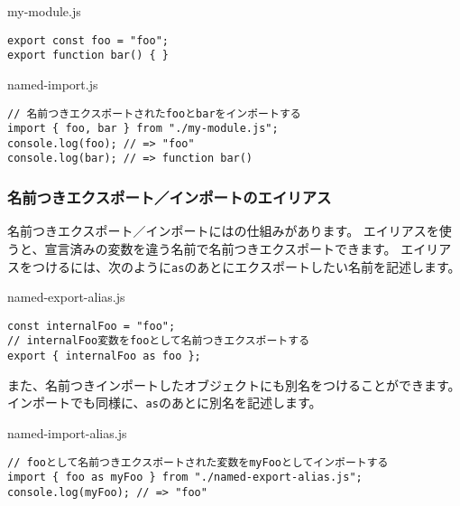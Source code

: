 \begin{listtitle}
my-module.js
\end{listtitle}
\begin{lstlisting}
export const foo = "foo";
export function bar() { }
\end{lstlisting}
\listend

\begin{listtitle}
named-import.js
\end{listtitle}
\enlargethispage{\baselineskip}\begin{lstlisting}
// 名前つきエクスポートされたfooとbarをインポートする
import { foo, bar } from "./my-module.js";
console.log(foo); // => "foo"
console.log(bar); // => function bar()
\end{lstlisting}
\listend

\hypertarget{named-export-import-alias}{%
\subsubsection{名前つきエクスポート／インポートのエイリアス}\label{named-export-import-alias}}

名前つきエクスポート／インポートには\textbf{}の仕組みがあります。
エイリアスを使うと、宣言済みの変数を違う名前で名前つきエクスポートできます。
エイリアスをつけるには、次のように\texttt{as}のあとにエクスポートしたい名前を記述します。

\begin{listtitle}
named-export-alias.js
\end{listtitle}
\begin{lstlisting}
const internalFoo = "foo";
// internalFoo変数をfooとして名前つきエクスポートする
export { internalFoo as foo };
\end{lstlisting}
\listend

また、名前つきインポートしたオブジェクトにも別名をつけることができます。
インポートでも同様に、\texttt{as}のあとに別名を記述します。

\begin{listtitle}
named-import-alias.js
\end{listtitle}
\begin{lstlisting}
// fooとして名前つきエクスポートされた変数をmyFooとしてインポートする
import { foo as myFoo } from "./named-export-alias.js";
console.log(myFoo); // => "foo"
\end{lstlisting}
\listend


